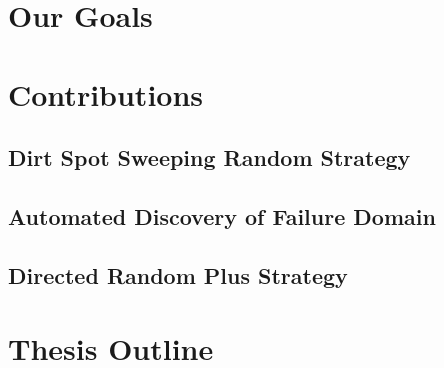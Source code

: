\section{Our Goals}

\section{Contributions}
\subsection{Dirt Spot Sweeping Random Strategy}
\subsection{Automated Discovery of Failure Domain}
\subsection{Directed Random Plus Strategy}

\section{Thesis Outline}